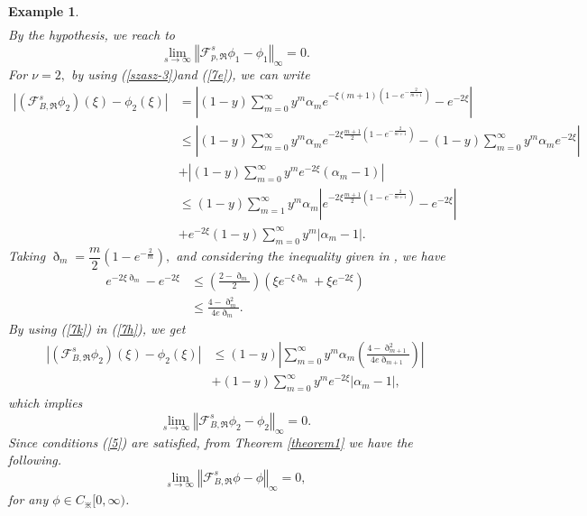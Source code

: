 \documentclass{amsart}
\theoremstyle{plain}
\newtheorem{example}{Example}
\numberwithin{equation}{section}
\begin{document}
\begin{example}
\begin{align*}
\end{align*}
By the hypothesis, we reach to%
\[
\lim_{s\rightarrow \infty}\left \Vert \mathcal{F}_{p,\Re}^{s}\phi_{1}-\phi
_{1}\right \Vert _{\infty}=0.
\]
For $\nu=2,$ by using (\ref{szasz-3})and (\ref{7e}), we can write%
\begin{align}
\left \vert \left(  \mathcal{F}_{B,\Re}^{s}\phi_{2}\right)  \left(  \xi \right)
-\phi_{2}\left(  \xi \right)  \right \vert  &  =\left \vert (1-y)\sum
_{m=0}^{\infty}y^{m}\alpha_{m}e^{-\xi \left(  m+1\right)  (1-e^{-\frac{2}{m+1}%
})}-e^{-2\xi}\right \vert \nonumber \\
&  \leq \left \vert (1-y)\sum_{m=0}^{\infty}y^{m}\alpha_{m}e^{-2\xi \frac{m+1}%
{2}(1-e^{-\frac{2}{m+1}})}-(1-y)\sum_{m=0}^{\infty}y^{m}\alpha_{m}e^{-2\xi
}\right \vert \nonumber \\
&  +\left \vert (1-y)\sum_{m=0}^{\infty}y^{m}e^{-2\xi}\left(  \alpha
_{m}-1\right)  \right \vert \nonumber \\
&  \leq(1-y)\sum_{m=1}^{\infty}y^{m}\alpha_{m}\left \vert e^{-2\xi \frac{m+1}%
{2}(1-e^{-\frac{2}{m+1}})}-e^{-2\xi}\right \vert \nonumber \\
&  +e^{-2\xi}(1-y)\sum_{m=0}^{\infty}y^{m}\left \vert \alpha_{m}-1\right \vert
.\label{7h}%
\end{align}
Taking $\eth _{m}=\dfrac{m}{2}(1-e^{-\frac{2}{m}}),$ and considering the
inequality given in \cite{holhos2018}, we have%
\begin{align}
e^{-2\xi \eth _{m}}-e^{-2\xi} &  \leq \left(  \frac{2-\eth _{m}}{2}\right)
\left(  \xi e^{-\xi \eth _{m}}+\xi e^{-2\xi}\right)  \nonumber \\
&  \leq \frac{4-\eth _{m}^{2}}{4e\eth _{m}}.\label{7k}%
\end{align}
By using (\ref{7k}) in (\ref{7h}), we get%
\begin{align*}
\left \vert \left(  \mathcal{F}_{B,\Re}^{s}\phi_{2}\right)  \left(  \xi \right)
-\phi_{2}\left(  \xi \right)  \right \vert  &  \leq(1-y)\left \vert \sum
_{m=0}^{\infty}y^{m}\alpha_{m}\left(  \frac{4-\eth _{m+1}^{2}}{4e\eth _{m+1}%
}\right)  \right \vert \\
&  +(1-y)\sum_{m=0}^{\infty}y^{m}e^{-2\xi}\left \vert \alpha_{m}-1\right \vert ,
\end{align*}
which implies%
\[
\lim_{s\rightarrow \infty}\left \Vert \mathcal{F}_{B,\Re}^{s}\phi_{2}-\phi
_{2}\right \Vert _{\infty}=0.
\]
Since conditions (\ref{5}) are satisfied, from Theorem \ref{theorem1} we have
the following.
\[
\lim_{s\rightarrow \infty}\left \Vert \mathcal{F}_{B,\Re}^{s}\phi-\phi
\right \Vert _{\infty}=0,
\]
for any $\phi \in C_{\divideontimes}[0,\infty)$.
\end{example}
\end{document}

